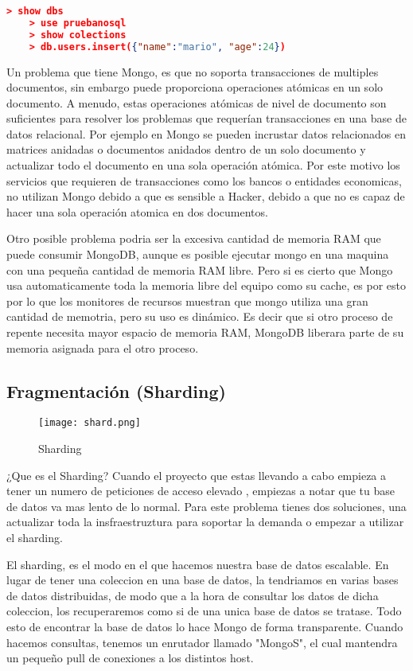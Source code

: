 \begin{lstlisting}[language=JSON] 
    > show dbs
    > use pruebanosql
    > show colections
    > db.users.insert({"name":"mario", "age":24})
\end{lstlisting}

Un problema que tiene Mongo, es que no soporta transacciones de multiples documentos, sin embargo puede proporciona operaciones atómicas en un solo documento. A menudo, estas operaciones atómicas de nivel de documento son suficientes para resolver los problemas que requerían transacciones en una base de datos relacional. Por ejemplo en Mongo se pueden incrustar datos relacionados en matrices anidadas o documentos anidados dentro de un solo documento y actualizar todo el documento en una sola operación atómica. Por este motivo los servicios que requieren de transacciones como los bancos o entidades economicas, no utilizan Mongo debido a que es sensible a Hacker, debido a que no es capaz de hacer una sola operación atomica en dos documentos.

Otro posible problema podria ser la excesiva cantidad de memoria RAM que puede consumir MongoDB, aunque es posible ejecutar mongo en una maquina con una pequeña cantidad de memoria RAM libre. Pero si es cierto que Mongo usa automaticamente toda la memoria libre del equipo como su cache, es por esto por lo que los monitores de recursos muestran que mongo utiliza una gran cantidad de memotria, pero su uso es dinámico. Es decir que si otro proceso de repente necesita mayor espacio de memoria RAM, MongoDB liberara parte de su memoria asignada para el otro proceso.

\subsection{Fragmentación (Sharding)}
\begin{figure}[H]
    \centering
    \texttt{[image: shard.png]}
    \caption{Sharding}
\end{figure}
¿Que es el Sharding? Cuando el proyecto que estas llevando a cabo empieza a tener un numero de peticiones de acceso elevado , empiezas a notar que tu base de datos va mas lento de lo normal. Para este problema tienes dos soluciones, una actualizar toda la insfraestruztura para soportar la demanda o empezar a utilizar el sharding.

El sharding, es el modo en el que hacemos nuestra base de datos escalable. En lugar de tener una coleccion en una base de datos, la tendriamos en varias bases de datos distribuidas, de modo que a la hora de consultar los datos de dicha coleccion, los recuperaremos como si de una unica base de datos se tratase. Todo esto de encontrar la base de datos lo hace Mongo de forma transparente. Cuando hacemos consultas, tenemos un enrutador llamado "MongoS", el cual mantendra un pequeño pull de conexiones a los distintos host.

